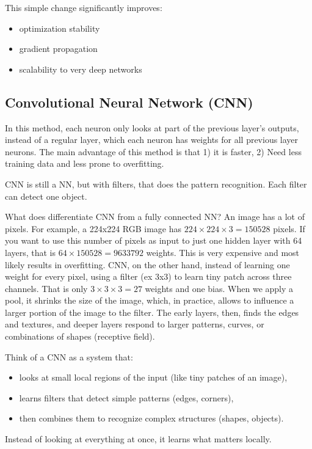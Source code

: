 \documentclass[12pt]{report}
\begin{document}
This simple change significantly improves:
\begin{itemize}
	\item optimization stability
	\item gradient propagation
	\item scalability to very deep networks
\end{itemize}





\subsection{Convolutional Neural Network (CNN)}
In this method, each neuron only looks at part of the previous layer's outputs, instead of a regular layer, which each neuron has weights for all previous layer neurons. The main advantage of this method is that 1) it is faster, 2) Need less training data and less prone to overfitting.

CNN is still a NN, but with filters, that does the pattern recognition. Each filter can detect one object. 

What does differentiate CNN from a fully connected NN? An image has a lot of pixels. For example, a 224x224 RGB image has $ 224 \times 224 \times 3 = 150528$ pixels. If you want to use this number of pixels as input to just one hidden layer with 64 layers, that is $64 \times 150528 = 9633792$ weights. This is very expensive and most likely results in overfitting. CNN, on the other hand, instead of learning one weight for every pixel, using a filter (ex 3x3) to learn tiny patch across three channels. That is only $3\times3 \times 3=27$ weights and one bias. When we apply a pool, it shrinks the size of the image, which, in practice, allows to influence a larger portion of the image to the filter. The early layers, then, finds the edges and textures, and deeper layers respond to larger patterns, curves, or combinations of shapes (receptive field).

Think of a CNN as a system that:

\begin{itemize}
  \item looks at small local regions of the input (like tiny patches of an image),
  \item learns filters that detect simple patterns (edges, corners),
  \item then combines them to recognize complex structures (shapes, objects).
\end{itemize}
Instead of looking at everything at once, it learns what matters locally.
\end{document}
